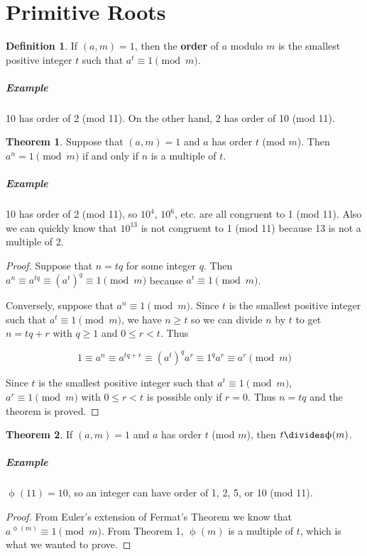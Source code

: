 \documentclass{article}
\theoremstyle{definition} %
\newtheorem{theorem}{Theorem}[section] %
\theoremstyle{definition}
\theoremstyle{definition}
\newcommand{\tot}{\upphi}
\theoremstyle{definition}
\newtheorem{definition}{Definition}[section]
\begin{document}
  \section{Primitive Roots}
  
  \begin{definition}
    If $(a, m) = 1$, then the \textbf{order} of $a$ modulo $m$ is the smallest positive
    integer $t$ such that $a^t \equiv 1 \pmod{m}$.
  \end{definition}
  
  \subparagraph{Example} 10 has order of 2 (mod 11). On the other hand, 2 has order of 10 (mod 11).
  
  \begin{theorem}
    Suppose that $(a, m) = 1$ and $a$ has order $t$ (mod $m$). Then $a^n = 1 \pmod{m}$ if and only if
    $n$ is a multiple of $t$.
  \end{theorem}
  
  \subparagraph{Example} 10 has order of 2 (mod 11), so $10^4$, $10^6$, etc. are all congruent to 1 (mod 11).
  Also we can quickly know that $10^{13}$ is not congruent to 1 (mod 11) because 13 is not a multiple of 2.
  
  \begin{proof}
    Suppose that $n = tq$ for some integer $q$. Then $a^n \equiv a^{tq} \equiv (a^t)^q \equiv 1 \pmod{m}$
    because $a^t \equiv 1 \pmod{m}$.
    
    Conversely, suppose that $a^n \equiv 1 \pmod{m}$. Since $t$ is the smallest positive integer such that
    $a^t \equiv 1 \pmod{m}$, we have $n \geq t$ so we can divide $n$ by $t$ to get $n = tq + r$ with
    $q \geq 1$ and $0 \leq r < t$. Thus
    
    \[ 1 \equiv a^n \equiv a^{tq + r} \equiv (a^t)^q a^r \equiv 1^q a^r \equiv a^r \pmod{m} \]
    
    Since $t$ is the smallest positive integer such that $a^t \equiv 1 \pmod{m}$, $a^r \equiv 1 \pmod{m}$
    with $0 \leq r < t$ is possible only if $r = 0$. Thus $n = tq$ and the theorem is proved.
  \end{proof}
  
  \begin{theorem}
    If $(a, m) = 1$ and $a$ has order $t$ (mod $m$), then $t \divides \tot(m)$.
  \end{theorem}
  
  \subparagraph{Example} $\tot(11) = 10$, so an integer can have order of 1, 2, 5, or 10 (mod 11).
  
  \begin{proof}
    From Euler's extension of Fermat's Theorem we know that $a^{\tot(m)} \equiv 1 \pmod{m}$. From
    Theorem 1, $\tot(m)$ is a multiple of $t$, which is what we wanted to prove.
  \end{proof}
  
\end{document}
